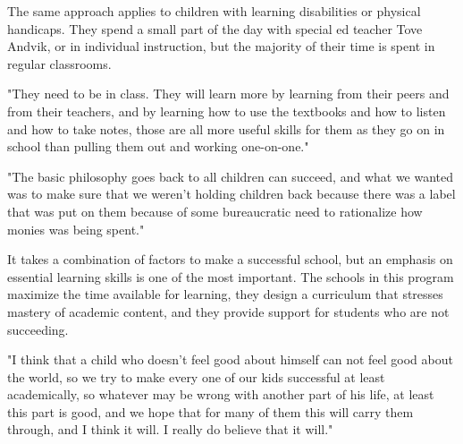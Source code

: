 The same approach applies to children with learning disabilities or physical handicaps. They spend a small part of the day with special ed teacher Tove Andvik, or in individual instruction, but the majority of their time is spent in regular classrooms.

"They need to be in class. They will learn more by learning from their peers and from their teachers, and by learning how to use the textbooks and how to listen and how to take notes, those are all more useful skills for them as they go on in school than pulling them out and working one-on-one."

"The basic philosophy goes back to all children can succeed, and what we wanted was to make sure that we weren't holding children back because there was a label that was put on them because of some bureaucratic need to rationalize how monies was being spent."

It takes a combination of factors to make a successful school, but an emphasis on essential learning skills is one of the most important. The schools in this program maximize the time available for learning, they design a curriculum that stresses mastery of academic content, and they provide support for students who are not succeeding.

"I think that a child who doesn't feel good about himself can not feel good about the world, so we try to make every one of our kids successful at least academically, so whatever may be wrong with another part of his life, at least this part is good, and we hope that for many of them this will carry them through, and I think it will. I really do believe that it will."